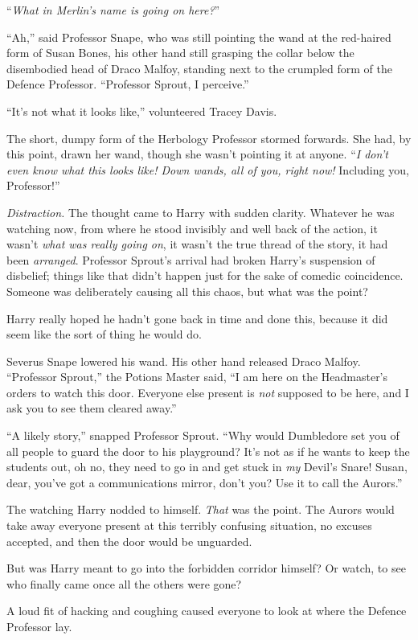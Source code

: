“\emph{What in Merlin’s name is going on here?}”

“Ah,” said Professor Snape, who was still pointing the wand at the red-haired form of Susan Bones, his other hand still grasping the collar below the disembodied head of Draco Malfoy, standing next to the crumpled form of the Defence Professor. “Professor Sprout, I perceive.”

“It’s not what it looks like,” volunteered Tracey Davis.

The short, dumpy form of the Herbology Professor stormed forwards. She had, by this point, drawn her wand, though she wasn’t pointing it at anyone. “\emph{I don’t even know what this looks like! \emph{Down wands, all of you,} right now!} Including you, Professor!”

\emph{Distraction.} The thought came to Harry with sudden clarity. Whatever he was watching now, from where he stood invisibly and well back of the action, it wasn’t \emph{what was really going on}, it wasn’t the true thread of the story, it had been \emph{arranged}. Professor Sprout’s arrival had broken Harry’s suspension of disbelief; things like that didn’t happen just for the sake of comedic coincidence. Someone was deliberately causing all this chaos, but what was the point?

Harry really hoped he hadn’t gone back in time and done this, because it did seem like the sort of thing he would do.

Severus Snape lowered his wand. His other hand released Draco Malfoy. “Professor Sprout,” the Potions Master said, “I am here on the Headmaster’s orders to watch this door. Everyone else present is \emph{not} supposed to be here, and I ask you to see them cleared away.”

“A likely story,” snapped Professor Sprout. “Why would Dumbledore set you of all people to guard the door to his playground? It’s not as if he wants to keep the students out, oh no, they need to go in and get stuck in \emph{my} Devil’s Snare! Susan, dear, you’ve got a communications mirror, don’t you? Use it to call the Aurors.”

The watching Harry nodded to himself. \emph{That} was the point. The Aurors would take away everyone present at this terribly confusing situation, no excuses accepted, and then the door would be unguarded.

But was Harry meant to go into the forbidden corridor himself? Or watch, to see who finally came once all the others were gone?

A loud fit of hacking and coughing caused everyone to look at where the Defence Professor lay.

